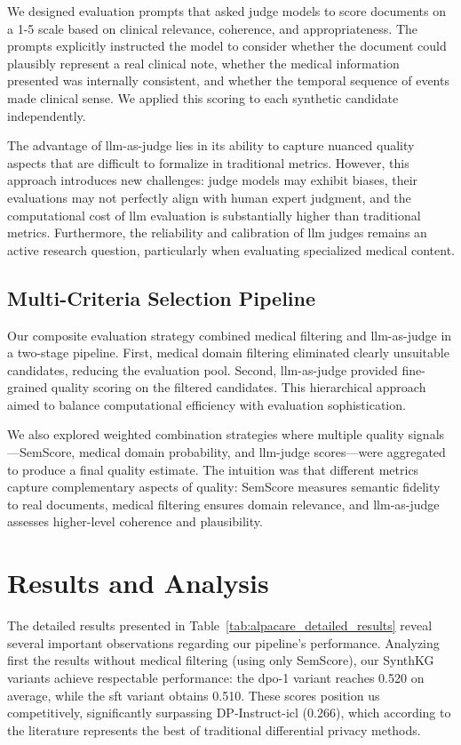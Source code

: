 We designed evaluation prompts that asked judge models to score documents on a 1-5 scale based on clinical relevance, coherence, and appropriateness. The prompts explicitly instructed the model to consider whether the document could plausibly represent a real clinical note, whether the medical information presented was internally consistent, and whether the temporal sequence of events made clinical sense. We applied this scoring to each synthetic candidate independently.

The advantage of \gls{llm}-as-judge lies in its ability to capture nuanced quality aspects that are difficult to formalize in traditional metrics. However, this approach introduces new challenges: judge models may exhibit biases, their evaluations may not perfectly align with human expert judgment, and the computational cost of \gls{llm} evaluation is substantially higher than traditional metrics. Furthermore, the reliability and calibration of \gls{llm} judges remains an active research question, particularly when evaluating specialized medical content.

\subsection{Multi-Criteria Selection Pipeline}
\label{subsec:multi-criteria}

Our composite evaluation strategy combined medical filtering and \gls{llm}-as-judge in a two-stage pipeline. First, medical domain filtering eliminated clearly unsuitable candidates, reducing the evaluation pool. Second, \gls{llm}-as-judge provided fine-grained quality scoring on the filtered candidates. This hierarchical approach aimed to balance computational efficiency with evaluation sophistication.

We also explored weighted combination strategies where multiple quality signals—SemScore, medical domain probability, and \gls{llm}-judge scores—were aggregated to produce a final quality estimate. The intuition was that different metrics capture complementary aspects of quality: SemScore measures semantic fidelity to real documents, medical filtering ensures domain relevance, and \gls{llm}-as-judge assesses higher-level coherence and plausibility.

\section{Results and Analysis}

The detailed results presented in Table~\ref{tab:alpacare_detailed_results} reveal several important observations regarding our pipeline's performance. Analyzing first the results without medical filtering (using only SemScore), our SynthKG variants achieve respectable performance: the \gls{dpo}-1 variant reaches 0.520 on average, while the \gls{sft} variant obtains 0.510. These scores position us competitively, significantly surpassing DP-Instruct-\gls{icl} (0.266), which according to the literature represents the best of traditional differential privacy methods.

